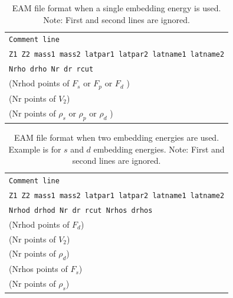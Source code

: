 \documentclass[a4paper,12pt,pdftex,onecolumn]{article}
\begin{document}
\begin{table}[!h]
\caption{
EAM file format when a single embedding energy is used.
Note: First and second lines are ignored.
\label{tab:kw-eam-ff}
}
\begin{center}
\begin{tabular}{|l|}
\hline
\hline
\verb+Comment line+ \\
\verb+Z1 Z2 mass1 mass2 latpar1 latpar2 latname1 latname2+ \\
\verb+Nrho drho Nr dr rcut+ \\
(Nrhod points of $F_s$ or $F_p$ or $F_d$ ) \\
(Nr points of $V_2$)  \\
(Nr points of $\rho_s$ or $\rho_p$ or $\rho_d$ ) \\
\hline
\hline
\end{tabular}
\end{center}
\end{table}

\begin{table}[!h]
\caption{
EAM file format when two embedding energies are used.
Example is for $s$ and $d$ embedding energies.
Note: First and second lines are ignored.
\label{tab:kw-eam-ff2}
}
\begin{center}
\begin{tabular}{|l|}
\hline
\hline
\verb+Comment line+ \\
\verb+Z1 Z2 mass1 mass2 latpar1 latpar2 latname1 latname2+ \\
\verb+Nrhod drhod Nr dr rcut Nrhos drhos+ \\
(Nrhod points of $F_d$) \\
(Nr points of $V_2$)  \\
(Nr points of $\rho_d$) \\
(Nrhos points of $F_s$) \\
(Nr points of $\rho_s$) \\
\hline
\hline
\end{tabular}
\end{center}
\end{table}
\end{document}
